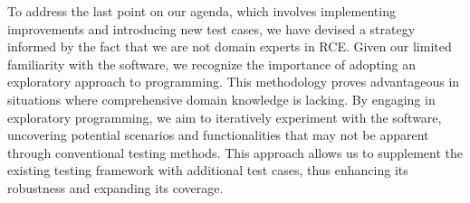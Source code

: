 To address the last point on our agenda, which involves implementing improvements and introducing new test cases, we have devised a strategy informed by the fact that we are not domain experts in \ac{RCE}. Given our limited familiarity with the software, we recognize the importance of adopting an exploratory approach to programming. This methodology proves advantageous in situations where comprehensive domain knowledge is lacking. By engaging in exploratory programming, we aim to iteratively experiment with the software, uncovering potential scenarios and functionalities that may not be apparent through conventional testing methods. This approach allows us to supplement the existing testing framework with additional test cases, thus enhancing its robustness and expanding its coverage.